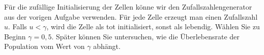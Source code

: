 \documentclass{article}[12pt]
\begin{document}
Für die zufällige Initialisierung der Zellen könne wir den Zufallszahlengenerator aus der vorigen Aufgabe verwenden.
Für jede Zelle erzeugt man einen Zufallszahl $u$.
Falls $u<\gamma$, wird die Zelle als tot initialisiert, sonst als lebendig.
Wählen Sie zu Beginn $\gamma=0,5$. 
Später können Sie untersuchen, wie die Überlebensrate der Population vom Wert von $\gamma$ abhängt.

\end{document}

